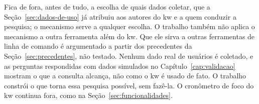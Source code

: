 Fica de fora, antes de tudo, a escolha de quais dados coletar, que a
Seção~\ref{sec:dados-de-uso} já atribuiu aos autores do kw e a quem conduzir a
pesquisa; o mecanismo serve a qualquer escolha. O trabalho também não aplica o
mecanismo a outra ferramenta além do kw. Que ele sirva a outras ferramentas de
linha de comando é argumentado a partir dos precedentes da
Seção~\ref{sec:precedentes}, não testado. Nenhum dado real de usuários é
coletado, e as perguntas respondidas com dados simulados no
Capítulo~\ref{cap:validacao} mostram o que a consulta alcança, não como o kw é
usado de fato. O trabalho constrói o que torna essa pesquisa possível, sem
fazê-la. O cronômetro de foco do kw continua fora, como na
Seção~\ref{sec:funcionalidades}.
